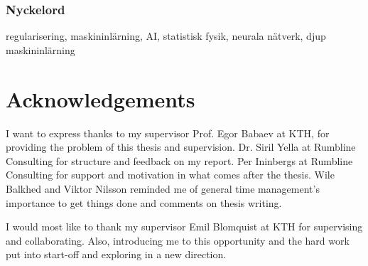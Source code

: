 \subsection*{Nyckelord}
regularisering, maskininlärning, AI, statistisk fysik, neurala nätverk, djup maskininlärning


\newpage
\thispagestyle{plain}
\chapter*{Acknowledgements}
I want to express thanks to my supervisor Prof. Egor Babaev at KTH, for providing the problem of this thesis and supervision. Dr. Siril Yella at Rumbline Consulting for structure and feedback on my report. Per Ininbergs at Rumbline Consulting for support and motivation in what comes after the thesis. Wile Balkhed and Viktor Nilsson reminded me of general time management's importance to get things done and comments on thesis writing. 

I would most like to thank my supervisor Emil Blomquist at KTH for supervising and collaborating. Also, introducing me to this opportunity and the hard work put into start-off and exploring in a new direction.

\newpage

\thispagestyle{plain}

\tableofcontents

\newpage
{}

